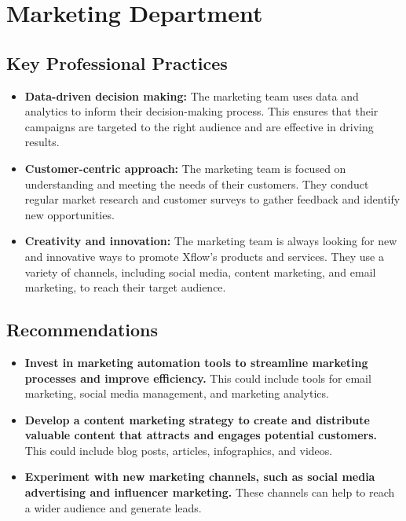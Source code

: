 \documentclass{article}
\begin{document}
\section{Marketing Department}

\subsection{Key Professional Practices}

\begin{itemize}
  \item \textbf{Data-driven decision making:} The marketing team uses data and analytics to inform their decision-making process. This ensures that their campaigns are targeted to the right audience and are effective in driving results.
  \item \textbf{Customer-centric approach:} The marketing team is focused on understanding and meeting the needs of their customers. They conduct regular market research and customer surveys to gather feedback and identify new opportunities.
  \item \textbf{Creativity and innovation:} The marketing team is always looking for new and innovative ways to promote Xflow's products and services. They use a variety of channels, including social media, content marketing, and email marketing, to reach their target audience.
\end{itemize}

\subsection{Recommendations}

\begin{itemize}
  \item \textbf{Invest in marketing automation tools to streamline marketing processes and improve efficiency.} This could include tools for email marketing, social media management, and marketing analytics.
  \item \textbf{Develop a content marketing strategy to create and distribute valuable content that attracts and engages potential customers.} This could include blog posts, articles, infographics, and videos.
  \item \textbf{Experiment with new marketing channels, such as social media advertising and influencer marketing.} These channels can help to reach a wider audience and generate leads.
\end{itemize}
\end{document}
